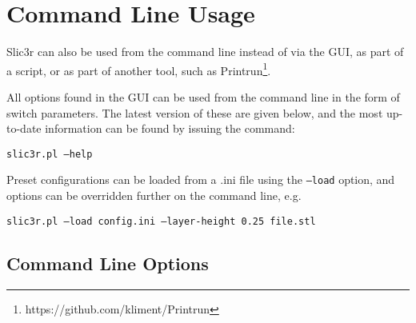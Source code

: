 
\section{Command Line Usage} %
\label{sec:command_line_usage}

Slic3r can also be used from the command line instead of via the GUI, as part of a script, or as part of another tool, such as Printrun\footnote{https://github.com/kliment/Printrun}.

All options found in the GUI can be used from the command line in the form of switch parameters.  The latest version of these are given below, and the most up-to-date information can be found by issuing the command: \par\texttt{slic3r.pl --help}

Preset configurations can be loaded from a .ini file using the \texttt{--load} option, and options can be overridden further on the command line, e.g. \par\texttt{slic3r.pl --load config.ini --layer-height 0.25 file.stl}

\subsection{Command Line Options} %
\label{sub:command_line_options}

